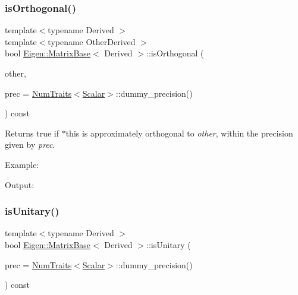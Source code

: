 \subsubsection{\texorpdfstring{isOrthogonal()}{isOrthogonal()}}
{\footnotesize\ttfamily template$<$typename Derived $>$ \\
template$<$typename Other\+Derived $>$ \\
bool \mbox{\hyperlink{class_eigen_1_1_matrix_base}{Eigen\+::\+Matrix\+Base}}$<$ Derived $>$\+::is\+Orthogonal (\begin{DoxyParamCaption}\item[{const \mbox{\hyperlink{class_eigen_1_1_matrix_base}{Matrix\+Base}}$<$ Other\+Derived $>$ \&}]{other,  }\item[{const Real\+Scalar \&}]{prec = {\ttfamily \mbox{\hyperlink{struct_eigen_1_1_num_traits}{Num\+Traits}}$<$\mbox{\hyperlink{class_eigen_1_1_dense_base_a5feed465b3a8e60c47e73ecce83e39a2}{Scalar}}$>$\+:\+:dummy\+\_\+precision()} }\end{DoxyParamCaption}) const}

\begin{DoxyReturn}{Returns}
true if $\ast$this is approximately orthogonal to {\itshape other}, within the precision given by {\itshape prec}.
\end{DoxyReturn}
Example\+: 
\begin{DoxyCodeInclude}{0}
\end{DoxyCodeInclude}
 Output\+: 
\begin{DoxyVerbInclude}
\end{DoxyVerbInclude}
 \mbox{\label{class_eigen_1_1_matrix_base_a8a7ee34ce202cac3eeea9cf20c9e4833}} 
\subsubsection{\texorpdfstring{isUnitary()}{isUnitary()}}
{\footnotesize\ttfamily template$<$typename Derived $>$ \\
bool \mbox{\hyperlink{class_eigen_1_1_matrix_base}{Eigen\+::\+Matrix\+Base}}$<$ Derived $>$\+::is\+Unitary (\begin{DoxyParamCaption}\item[{const Real\+Scalar \&}]{prec = {\ttfamily \mbox{\hyperlink{struct_eigen_1_1_num_traits}{Num\+Traits}}$<$\mbox{\hyperlink{class_eigen_1_1_dense_base_a5feed465b3a8e60c47e73ecce83e39a2}{Scalar}}$>$\+:\+:dummy\+\_\+precision()} }\end{DoxyParamCaption}) const}

